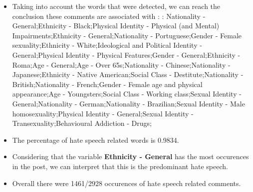 \documentclass[11pt]{article}
\begin{document}
\begin{itemize}\item Taking into account the words that were detected, we can reach the conclusion these comments are associated with : : Nationality - General;Ethnicity - Black;Physical Identity - Physical (and Mental) Impairments;Ethnicity - General;Nationality - Portuguese;Gender - Female sexuality;Ethnicity - White;Ideological and Political Identity - General;Physical Identity - Physical Features;Gender - General;Ethnicity - Roma;Age - General;Age - Over 65s;Nationality - Chinese;Nationality - Japanese;Ethnicity - Native American;Social Class - Destitute;Nationality - British;Nationality - French;Gender - Female age and physical appearance;Age - Youngsters;Social Class - Working class;Sexual Identity - General;Nationality - German;Nationality - Brazilian;Sexual Identity - Male homosexuality;Physical Identity - General;Sexual Identity - Transexuality;Behavioural Addiction - Drugs;%

\item The percentage of hate speech related words is 0.9834.

\item Considering that the variable \textbf{Ethnicity - General} has the most occurences in the post, we can interpret that this is the predominant hate speech.

\item Overall there were 1461/2928 occurences of hate speech related comments.\end{itemize}
\end{document}
